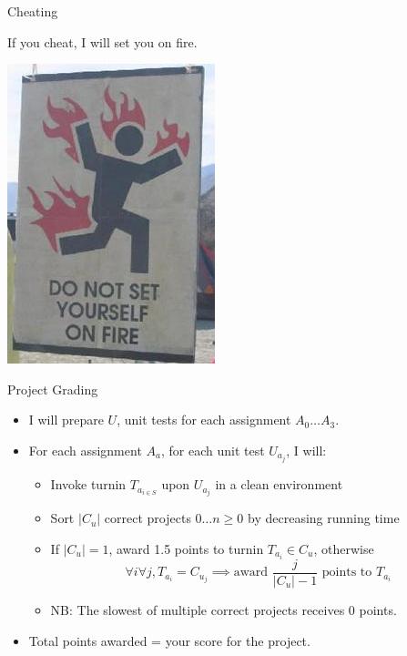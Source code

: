 \documentclass{beamer}
\begin{document}
\begin{frame}{Cheating}
\begin{center}
If you cheat, I will set you on fire.
\vspace{.5in}

\includegraphics[scale=0.5]{images/setonfire.jpg}
\end{center}
\end{frame}

\begin{frame}{Project Grading}
\begin{itemize}
\item I will prepare $U$, unit tests for each assignment $A_0 \dotsc A_3$.
\item For each assignment $A_a$, for each unit test $U_{a_j}$, I will:
\begin{itemize}
\item Invoke turnin $T_{a_{i \in S}}$ upon $U_{a_j}$ in a clean environment
\item Sort $|C_u|$ correct projects $0 \dotsc n\ge 0$ by decreasing running time
\item If $|C_u| = 1$, award 1.5 points to turnin $T_{a_i} \in C_u$, otherwise
\begin{equation}
\forall i \forall j, T_{a_i} = C_{u_j} \implies \text{award } \frac{j}{|C_u| - 1} \text{ points to } T_{a_i}
\nonumber
\end{equation}
\item NB: The slowest of multiple correct projects receives 0 points.
\end{itemize}
\item Total points awarded = your score for the project.
\end{itemize}
\end{frame}
\end{document}
